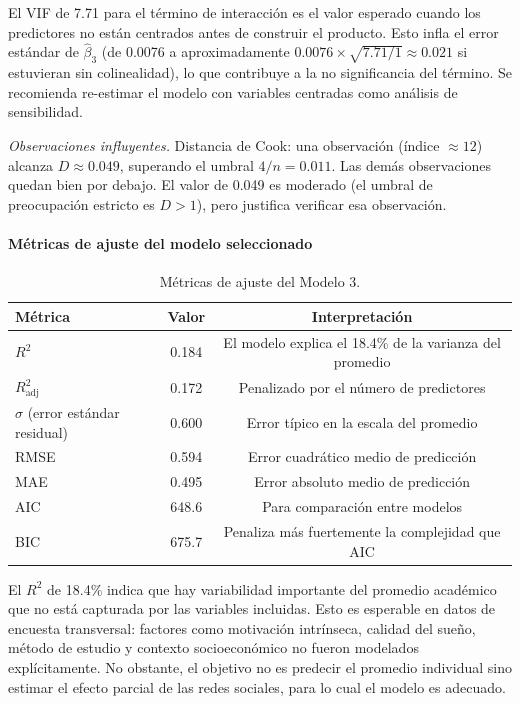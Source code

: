 \documentclass[12pt]{article}
\begin{document}
El VIF de 7.71 para el término de interacción es el valor esperado cuando los predictores no están centrados antes de construir el producto. Esto infla el error estándar de \(\hat\beta_3\) (de 0.0076 a aproximadamente \(0.0076 \times \sqrt{7.71/1} \approx 0.021\) si estuvieran sin colinealidad), lo que contribuye a la no significancia del término. Se recomienda re-estimar el modelo con variables centradas como análisis de sensibilidad.

\textit{Observaciones influyentes.} Distancia de Cook: una observación (índice \(\approx 12\)) alcanza \(D \approx 0.049\), superando el umbral \(4/n = 0.011\). Las demás observaciones quedan bien por debajo. El valor de 0.049 es moderado (el umbral de preocupación estricto es \(D > 1\)), pero justifica verificar esa observación.

\paragraph{Métricas de ajuste del modelo seleccionado}

\begin{table}[H]
\centering
\caption{Métricas de ajuste del Modelo 3.}
\begin{tabular}{lcc}
\toprule
Métrica & Valor & Interpretación \\
\midrule
\(R^2\) & 0.184 & El modelo explica el 18.4\% de la varianza del promedio \\
\(R^2_{\text{adj}}\) & 0.172 & Penalizado por el número de predictores \\
\(\sigma\) (error estándar residual) & 0.600 & Error típico en la escala del promedio \\
RMSE & 0.594 & Error cuadrático medio de predicción \\
MAE & 0.495 & Error absoluto medio de predicción \\
AIC & 648.6 & Para comparación entre modelos \\
BIC & 675.7 & Penaliza más fuertemente la complejidad que AIC \\
\bottomrule
\end{tabular}
\label{tab:metricas_modelo3}
\end{table}

El \(R^2\) de 18.4\% indica que hay variabilidad importante del promedio académico que no está capturada por las variables incluidas. Esto es esperable en datos de encuesta transversal: factores como motivación intrínseca, calidad del sueño, método de estudio y contexto socioeconómico no fueron modelados explícitamente. No obstante, el objetivo no es predecir el promedio individual sino estimar el efecto parcial de las redes sociales, para lo cual el modelo es adecuado.
\end{document}
